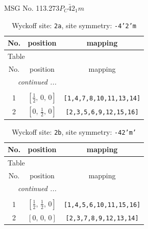 \documentclass[fleqn,8pt]{jsarticle}
\begin{document}
\setcounter{MaxMatrixCols}{32}

\renewcommand{\tablename}{Table~}
\renewcommand{\figurename}{Figure~}
\begin{center}
\LARGE
MSG No. 113.273\quad$P_{C}\bar{4}2_{1}m$
\end{center}
\renewcommand{\arraystretch}{1.2}
\begin{longtable}{ccc}
\caption{Wyckoff site: {\tt 2a}, site symmetry: {\tt -4'2'm}}
 \\
 \hline \hline
No. & position & mapping \\ \hline \endfirsthead

\multicolumn{2}{l}{\tablename\ \thetable{}} \\
 \hline \hline
No. & position & mapping \\ \hline \endhead

 \hline \hline
\multicolumn{2}{r}{\footnotesize\it continued ...} \\ \endfoot

 \hline \hline
\multicolumn{2}{r}{} \\ \endlastfoot

1 & $\left[ \frac{1}{2},\, 0,\, 0 \right]$ & {\tt [1,4,7,8,10,11,13,14]} \\ \hline
2 & $\left[ 0,\, \frac{1}{2},\, 0 \right]$ & {\tt [2,3,5,6,9,12,15,16]} \\
\end{longtable}
\renewcommand{\arraystretch}{1.2}
\begin{longtable}{ccc}
\caption{Wyckoff site: {\tt 2b}, site symmetry: {\tt -42'm'}}
 \\
 \hline \hline
No. & position & mapping \\ \hline \endfirsthead

\multicolumn{2}{l}{\tablename\ \thetable{}} \\
 \hline \hline
No. & position & mapping \\ \hline \endhead

 \hline \hline
\multicolumn{2}{r}{\footnotesize\it continued ...} \\ \endfoot

 \hline \hline
\multicolumn{2}{r}{} \\ \endlastfoot

1 & $\left[ \frac{1}{2},\, \frac{1}{2},\, 0 \right]$ & {\tt [1,4,5,6,10,11,15,16]} \\ \hline
2 & $\left[ 0,\, 0,\, 0 \right]$ & {\tt [2,3,7,8,9,12,13,14]} \\
\end{longtable}
\end{document}
